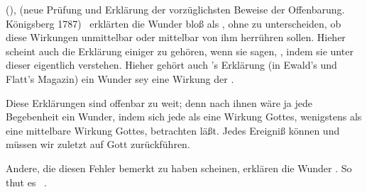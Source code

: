 \begin{aufza}\setcounter{enumi}{1}
\item {} (),  (neue Prüfung und Erklärung der vorzüglichsten Beweise der Offenbarung. Königsberg 1787) \umA\  erklärten die Wunder bloß als , ohne zu unterscheiden, ob diese Wirkungen unmittelbar oder mittelbar von ihm herrühren sollen. Hieher scheint auch die Erklärung einiger  zu gehören, wenn sie sagen, , indem sie unter dieser  eigentlich  verstehen. Hieher gehört auch 's Erklärung (in Ewald's und Flatt's Magazin) ein Wunder sey eine Wirkung der .
\end{aufza}\par
   Diese Erklärungen sind offenbar zu weit; denn nach ihnen wäre ja jede Begebenheit ein Wunder, indem sich jede als eine Wirkung Gottes, wenigstens als eine mittelbare Wirkung Gottes, betrachten läßt. Jedes Ereigniß können und müssen wir zuletzt auf Gott zurückführen.
\begin{aufza}\setcounter{enumi}{2}
\item Andere, die diesen Fehler bemerkt zu haben scheinen, erklären die Wunder . So thut es \zB\ .
\end{aufza}\par
